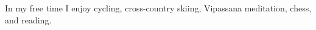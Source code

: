     In my free time I enjoy cycling, cross-country skiing, Vipassana meditation, chess, and reading.
